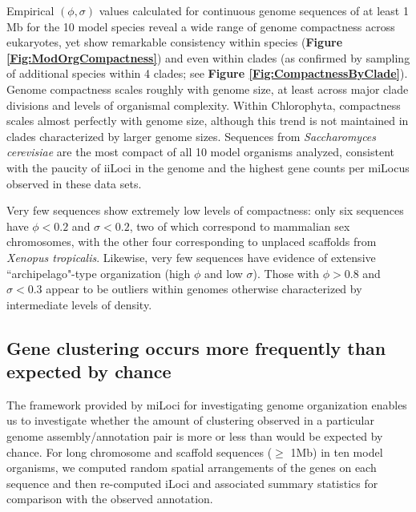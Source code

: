Empirical $(\phi,\sigma)$ values calculated for continuous genome sequences of at least 1 Mb for the 10 model species reveal a wide range of genome compactness across eukaryotes, yet show remarkable consistency within species (\textbf{Figure \ref{Fig:ModOrgCompactness}}) and even within clades (as confirmed by sampling of additional species within 4 clades; see \textbf{Figure \ref{Fig:CompactnessByClade}}).
Genome compactness scales roughly with genome size, at least across major clade divisions and levels of organismal complexity.
Within Chlorophyta, compactness scales almost perfectly with genome size, although this trend is not maintained in clades characterized by larger genome sizes.
Sequences from \textit{Saccharomyces cerevisiae} are the most compact of all 10 model organisms analyzed, consistent with the paucity of iiLoci in the genome and the highest gene counts per miLocus observed in these data sets.

Very few sequences show extremely low levels of compactness: only six sequences have $\phi < 0.2$ and $\sigma < 0.2$, two of which correspond to mammalian sex chromosomes, with the other four corresponding to unplaced scaffolds from \textit{Xenopus tropicalis}.
Likewise, very few sequences have evidence of extensive ``archipelago"-type organization (high $\phi$ and low $\sigma$).
Those with $\phi > 0.8$ and $\sigma < 0.3$ appear to be outliers within genomes otherwise characterized by intermediate levels of density.

\subsection*{Gene clustering occurs more frequently than expected by chance}

The framework provided by miLoci for investigating genome organization enables us to investigate whether the amount of clustering observed in a particular genome assembly/annotation pair is more or less than would be expected by chance.
For long chromosome and scaffold sequences ($\geq$ 1Mb) in ten model organisms, we computed random spatial arrangements of the genes on each sequence and then re-computed iLoci and associated summary statistics for comparison with the observed annotation.

